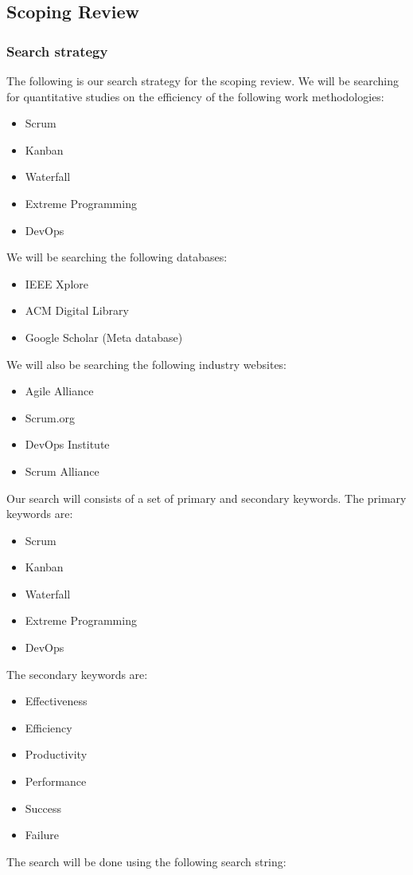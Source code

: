 \documentclass[12pt]{article}
\begin{document}
\subsection{Scoping Review}

\subsubsection{Search strategy}
The following is our search strategy for the scoping review.
We will be searching for quantitative studies on the efficiency of the following work methodologies:
\begin{itemize}
  \item Scrum
  \item Kanban
  \item Waterfall
  \item Extreme Programming
  \item DevOps
\end{itemize}
We will be searching the following databases:
\begin{itemize}
  \item IEEE Xplore \cite{IEEEXplore}
  \item ACM Digital Library \cite{ACMDigitalLibrary}
  \item Google Scholar \cite{GoogleScholar} (Meta database)
\end{itemize}
We will also be searching the following industry websites:
\begin{itemize}
  \item Agile Alliance \cite{AgileAlliance2015}
  \item Scrum.org \cite{HomeScrumorg}
  \item DevOps Institute \cite{Organisations}
  \item Scrum Alliance \cite{ScrumAllianceFind}
\end{itemize}
Our search will consists of a set of primary and secondary keywords.
The primary keywords are:
\begin{itemize}
  \item Scrum
  \item Kanban
  \item Waterfall
  \item Extreme Programming
  \item DevOps
\end{itemize}
The secondary keywords are:
\begin{itemize}
  \item Effectiveness
  \item Efficiency
  \item Productivity
  \item Performance
  \item Success
  \item Failure
\end{itemize}
The search will be done using the following search string:
\end{document}

